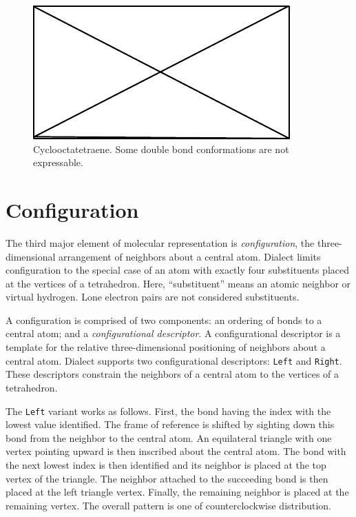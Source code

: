 \documentclass{article}
\def\ttt{\texttt}
\begin{document}
\begin{figure}
    \centering
    \includegraphics{filler}
    \caption{Cyclooctatetraene. Some double bond conformations are not expressable.}
    \label{fig:cyclooctatetraene}
\end{figure}

\section*{Configuration}

The third major element of molecular representation is \textit{configuration}, the three-dimensional arrangement of neighbors about a central atom. Dialect limits configuration to the special case of an atom with exactly four substituents placed at the vertices of a tetrahedron. Here, \enquote{substituent} means an atomic neighbor or virtual hydrogen. Lone electron pairs are not considered substituents.

A configuration is comprised of two components: an ordering of bonds to a central atom; and a \textit{configurational descriptor}. A configurational descriptor is a template for the relative three-dimensional positioning of neighbors about a central atom. Dialect supports two configurational descriptors: \ttt{Left} and \ttt{Right}. These descriptors constrain the neighbors of a central atom to the vertices of a tetrahedron.

The \ttt{Left} variant works as follows. First, the bond having the index with the lowest value identified. The frame of reference is shifted by sighting down this bond from the neighbor to the central atom. An equilateral triangle with one vertex pointing upward is then inscribed about the central atom. The bond with the next lowest index is then identified and its neighbor is placed at the top vertex of the triangle. The neighbor attached to the succeeding bond is then placed at the left triangle vertex. Finally, the remaining neighbor is placed at the remaining vertex. The overall pattern is one of counterclockwise distribution.
\end{document}
